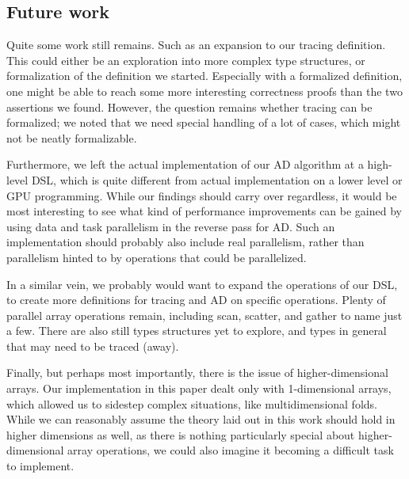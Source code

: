     \subsection{Future work}
        Quite some work still remains.
        Such as an expansion to our tracing definition.
        This could either be an exploration into more complex type structures, or formalization of the definition we started.
        Especially with a formalized definition, one might be able to reach some more interesting correctness proofs than the two assertions we found.
        However, the question remains whether tracing can be formalized; we noted that we need special handling of a lot of cases, which might not be neatly formalizable.

        Furthermore, we left the actual implementation of our AD algorithm at a high-level DSL, which is quite different from actual implementation on a lower level or GPU programming.
        While our findings should carry over regardless, it would be most interesting to see what kind of performance improvements can be gained by using data and task parallelism in the reverse pass for AD.
        Such an implementation should probably also include real parallelism, rather than parallelism hinted to by operations that could be parallelized.

        In a similar vein, we probably would want to expand the operations of our DSL, to create more definitions for tracing and AD on specific operations.
        Plenty of parallel array operations remain, including scan, scatter, and gather to name just a few.
        There are also still types structures yet to explore, and types in general that may need to be traced (away).

        Finally, but perhaps most importantly, there is the issue of higher-dimensional arrays.
        Our implementation in this paper dealt only with 1-dimensional arrays, which allowed us to sidestep complex situations, like multidimensional folds.
        While we can reasonably assume the theory laid out in this work should hold in higher dimensions as well, as there is nothing particularly special about higher-dimensional array operations, we could also imagine it becoming a difficult task to implement.

